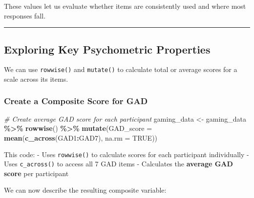 \documentclass[
]{book}
\newenvironment{Shaded}{\begin{snugshade}}{\end{snugshade}}
\newcommand{\AttributeTok}[1]{\textcolor[rgb]{0.13,0.29,0.53}{#1}}
\newcommand{\CommentTok}[1]{\textcolor[rgb]{0.56,0.35,0.01}{\textit{#1}}}
\newcommand{\ConstantTok}[1]{\textcolor[rgb]{0.56,0.35,0.01}{#1}}
\newcommand{\FunctionTok}[1]{\textcolor[rgb]{0.13,0.29,0.53}{\textbf{#1}}}
\newcommand{\NormalTok}[1]{#1}
\newcommand{\OtherTok}[1]{\textcolor[rgb]{0.56,0.35,0.01}{#1}}
\newcommand{\SpecialCharTok}[1]{\textcolor[rgb]{0.81,0.36,0.00}{\textbf{#1}}}
\begin{document}
These values let us evaluate whether items are consistently used and where most responses fall.

\begin{center}\rule{0.5\linewidth}{0.5pt}\end{center}

\subsection*{\texorpdfstring{\textbf{Exploring Key Psychometric Properties}}{Exploring Key Psychometric Properties}}\label{exploring-key-psychometric-properties}

We can use \texttt{rowwise()} and \texttt{mutate()} to calculate total or average scores for a scale across its items.

\subsubsection{Create a Composite Score for GAD}\label{create-a-composite-score-for-gad}

\begin{Shaded}
\begin{Highlighting}[]
\CommentTok{\# Create average GAD score for each participant}
\NormalTok{gaming\_data }\OtherTok{\textless{}{-}}\NormalTok{ gaming\_data }\SpecialCharTok{\%\textgreater{}\%}
  \FunctionTok{rowwise}\NormalTok{() }\SpecialCharTok{\%\textgreater{}\%}
  \FunctionTok{mutate}\NormalTok{(}\AttributeTok{GAD\_score =} \FunctionTok{mean}\NormalTok{(}\FunctionTok{c\_across}\NormalTok{(GAD1}\SpecialCharTok{:}\NormalTok{GAD7), }\AttributeTok{na.rm =} \ConstantTok{TRUE}\NormalTok{))}
\end{Highlighting}
\end{Shaded}

This code: - Uses \texttt{rowwise()} to calculate scores for each participant individually - Uses \texttt{c\_across()} to access all 7 GAD items - Calculates the \textbf{average GAD score} per participant

We can now describe the resulting composite variable:

\begin{Shaded}
\end{Shaded}
\end{document}
